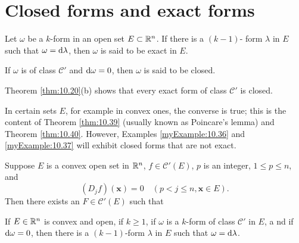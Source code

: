 
\section{Closed forms and exact forms}

\begin{mydef}
    Let $\omega$ be a $k$-form in an open set $E \subset {\protect\mathbb R}^n$. 
    If there is a $(k - 1)$- form $\lambda$ in $E$ such that $\omega = \d \lambda$, then $\omega$ is said to be exact in $E$.
    
    If $\omega$ is of class $\mathscr{C}'$ and $\d \omega = 0$, 
    then $\omega$ is said to be closed.
    
    Theorem \ref{thm:10.20}(b) shows that every exact form of class $\mathscr{C}'$ is closed.

    In certain sets $E$, for example in convex ones, the converse is true; 
    this is the content of Theorem \ref{thm:10.39} 
    (usually known as Poincare's lemma) and Theorem \ref{thm:10.40}. 
    However, Examples \ref{myExample:10.36} and \ref{myExample:10.37} will exhibit closed forms that are not exact.
\end{mydef}

\begin{myRemark}
    
\end{myRemark}

\begin{myExample}
    \label{myExample:10.36}
\end{myExample}

\begin{myExample}
    \label{myExample:10.37}
\end{myExample}

\begin{thm}
    \label{thm:10.38}
    Suppose $E$ is a convex open set in ${\protect\mathbb R}^n$,
    $f \in \mathscr{C}'(E)$, $p$ is an integer, 
    $1 \leq p \leq n$, and
    \begin{equation}
        \label{eq:10.116}
        (D_j f)(\mathbf{x}) = 0
        \quad 
        (p < j \leq n, \mathbf{x} \in E).
    \end{equation}
    Then there exists an $F \in \mathscr{C}'(E)$ such that
\end{thm}

\begin{thm}
    \label{thm:10.39}
    If $E \in {\protect\mathbb R}^n$ is convex and open, 
    if $k \geq 1$, 
    if $\omega$ is a $k$-form of class $\mathscr{C}'$ in $E$, a
    nd if $\d \omega = 0$, 
    then there is a $(k - 1)$-form $\lambda$ in $E$ 
    such that $\omega = \d \lambda$.
\end{thm}

